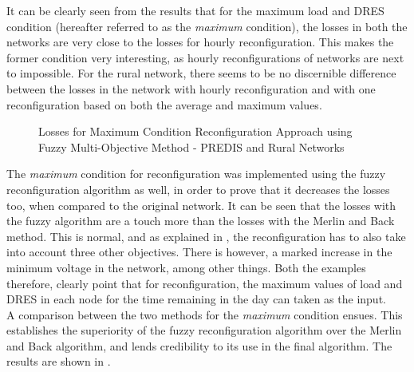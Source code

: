 It can be clearly seen from the results that for the maximum load and DRES condition (hereafter referred to as the \emph{maximum} condition), the losses in both the networks are very close to the losses for hourly reconfiguration. This makes the former condition very interesting, as hourly reconfigurations of networks are next to impossible. For the rural network, there seems to be no discernible difference between the losses in the network with hourly reconfiguration and with one reconfiguration based on both the average and maximum values.\\

\begin{figure}[!h]
\begin{minipage}[!h]{.5\textwidth}
	\centering
    \setlength\figureheight{5cm}
    \setlength\figurewidth{6cm}
	
\end{minipage}
\begin{minipage}[!h]{.5\textwidth}
	\centering
	\setlength\figureheight{5cm}
    \setlength\figurewidth{6cm}
	
\end{minipage}
\caption{Losses for Maximum Condition Reconfiguration Approach using Fuzzy Multi-Objective Method - PREDIS and Rural Networks}
\end{figure}

The \emph{maximum} condition for reconfiguration was implemented using the fuzzy reconfiguration algorithm as well, in order to prove that it decreases the losses too, when compared to the original network. It can be seen that the losses with the fuzzy algorithm are a touch more than the losses with the Merlin and Back method. This is normal, and as explained in , the reconfiguration has to also take into account three other objectives. There is however, a marked increase in the minimum voltage in the network, among other things. Both the examples therefore, clearly point that  for reconfiguration, the maximum values of load and DRES in each node for the time remaining in the day can taken as the input.\\

A comparison between the two methods for the \emph{maximum} condition ensues. This establishes the superiority of the fuzzy reconfiguration algorithm over the Merlin and Back algorithm, and lends credibility to its use in the final algorithm. The results are shown in .\\

